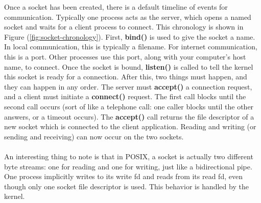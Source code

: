 \documentclass[11pt]{article}
\begin{document}
Once a socket has been created, there is a default timeline of events for communication. Typically one process acts as the server, which opens a named socket and waits for a client process to connect. This chronology is shown in Figure (\ref{fig:socket-chronology}). First, \textbf{bind()} is used to give the socket a name. In local communication, this is typically a filename. For internet communication, this is a port. Other processes use this port, along with your computer's host name, to connect. Once the socket is bound, \textbf{listen()} is called to tell the kernel this socket is ready for a connection. After this, two things must happen, and they can happen in any order. The server must \textbf{accept()} a connection request, and a client must initiate a \textbf{connect()} request. The first call blocks until the second call occurs (sort of like a telephone call: one caller blocks until the other answers, or a timeout occurs). The \textbf{accept()} call returns the file descriptor of a new socket which is connected to the client application. Reading and writing (or sending and receiving) can now occur on the two sockets.\\ \\
An interesting thing to note is that in POSIX, a socket is actually two different byte streams: one for reading and one for writing, just like a bidirectional pipe. One process implicitly writes to its write fd and reads from its read fd, even though only one socket file descriptor is used. This behavior is handled by the kernel. \\
\end{document}
